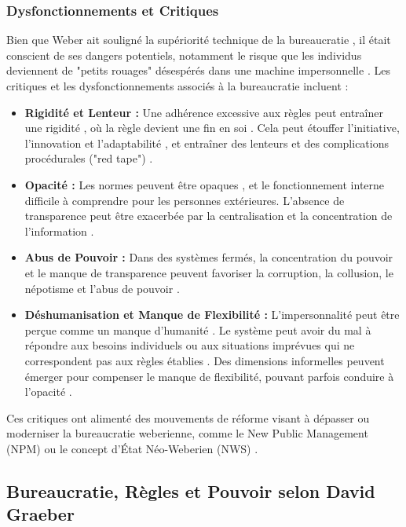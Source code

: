 \documentclass[10pt, twocolumn]{article}
\begin{document}
\subsubsection{Dysfonctionnements et Critiques}
Bien que Weber ait souligné la supériorité technique de la bureaucratie \citep{Weber1922, RedfameIJSSS}, il était conscient de ses dangers potentiels, notamment le risque que les individus deviennent de "petits rouages" désespérés dans une machine impersonnelle \citep{Weber1922}. Les critiques et les dysfonctionnements associés à la bureaucratie incluent :
\begin{itemize}
    \item \textbf{Rigidité et Lenteur :} Une adhérence excessive aux règles peut entraîner une rigidité \citep{Laguito2024, Hussain2019, Jaelani2024}, où la règle devient une fin en soi \citep{Weber1922}. Cela peut étouffer l'initiative, l'innovation et l'adaptabilité \citep{Laguito2024, Hussain2019}, et entraîner des lenteurs et des complications procédurales ("red tape") \citep{Serpa2019, Hussain2019, Jaelani2024}.
    \item \textbf{Opacité :} Les normes peuvent être opaques \citep{Serpa2019}, et le fonctionnement interne difficile à comprendre pour les personnes extérieures. L'absence de transparence peut être exacerbée par la centralisation et la concentration de l'information \citep{Hussain2019}.
    \item \textbf{Abus de Pouvoir :} Dans des systèmes fermés, la concentration du pouvoir et le manque de transparence peuvent favoriser la corruption, la collusion, le népotisme et l'abus de pouvoir \citep{Jaelani2024}.
    \item \textbf{Déshumanisation et Manque de Flexibilité :} L'impersonnalité peut être perçue comme un manque d'humanité \citep{Laguito2024}. Le système peut avoir du mal à répondre aux besoins individuels ou aux situations imprévues qui ne correspondent pas aux règles établies \citep{Serpa2019}. Des dimensions informelles peuvent émerger pour compenser le manque de flexibilité, pouvant parfois conduire à l'opacité \citep{Weber1922}.
\end{itemize}
Ces critiques ont alimenté des mouvements de réforme visant à dépasser ou moderniser la bureaucratie weberienne, comme le New Public Management (NPM) \citep{Jaelani2024, Bouckaert2022} ou le concept d'État Néo-Weberien (NWS) \citep{Bouckaert2022}.

\subsection{Bureaucratie, Règles et Pouvoir selon David Graeber}
\end{document}
